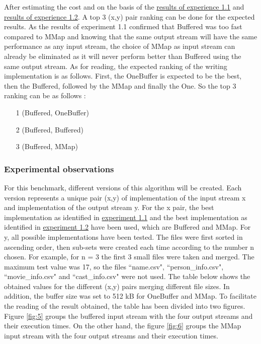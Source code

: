 \documentclass[12pt]{article}
\begin{document}
After estimating the cost and on the basis of the \hyperref[res1.1]{results of experience 1.1} and \hyperref[res1.2]{results of experience 1.2}. A top 3 (x,y) pair ranking can be done for the expected results. As the results of experiment 1.1 confirmed that Buffered was too fast compared to MMap and knowing that the same output stream will have the same performance as any input stream, the choice of MMap as input stream can already be eliminated as it will never perform better than Buffered using the same output stream. As for reading, the expected ranking of the writing implementation is as follows. First, the OneBuffer is expected to be the best, then the Buffered, followed by the MMap and finally the One. So the top 3 ranking can be as follows : 
\begin{itemize}
    \item[1] (Buffered, OneBuffer)
    \item[2] (Buffered, Buffered)
    \item[3] (Buffered, MMap)
\end{itemize}

\subsubsection{Experimental observations} \label{res1.3}
For this benchmark, different versions of this algorithm will be created. Each version represents a unique pair (x,y) of implementation of the input stream x and implementation of the output stream y. For the x pair, the best implementation as identified in \hyperref[exp1.1]{experiment 1.1} and the best implementation as identified in \hyperref[exp1.2]{experiment 1.2} have been used, which are Buffered and MMap. For y, all possible implementations have been tested. The files were first sorted in ascending order, then sub-sets were created each time according to the number n chosen. For example, for n = 3 the first 3 small files were taken and merged. The maximum test value was 17, so the files ``name.csv", ``person\_info.csv", ``movie\_info.csv" and ``cast\_info.csv" were not used. The table below shows the obtained values for the different (x,y) pairs merging different file sizes. In addition, the buffer size was set to 512 kB for OneBuffer and MMap. To facilitate the reading of the result obtained, the table has been divided into two figures. Figure \ref{fig:5} groups the buffered input stream with the four output streams and their execution times. On the other hand, the figure \ref{fig:6} groups the MMap input stream with the four output streams and their execution times.
\end{document}
